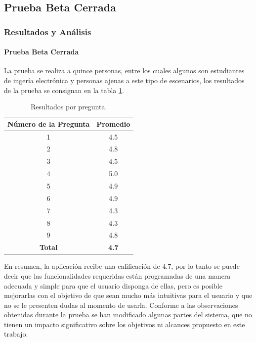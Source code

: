 \subsection{Prueba Beta Cerrada}
\begin{frame}[t]
\frametitle{Resultados y Análisis}
\framesubtitle{Prueba Beta Cerrada}
\footnotesize %
La prueba se realiza a quince personas, entre los cuales algunos son estudiantes de ingería electrónica y personas ajenas a este tipo de escenarios, los resultados de la prueba se consignan en la tabla \ref{table:enc}.

\begin{table}[H]
	\begin{center}
		\caption{Resultados por pregunta.}
		\label{table:enc}
		\begin{tabular}{|c|c|}
			\hline 
			\textbf{Número de la Pregunta} & \textbf{Promedio} \\ 
			\hline 
			1 & 4.5\\ 
			\hline 
			2 & 4.8\\ 
			\hline 
			3 & 4.5\\ 
			\hline 
			4 & 5.0\\ 
			\hline 
			5 & 4.9\\ 
			\hline 
			6 & 4.9\\ 
			\hline 
			7 & 4.3\\ 
			\hline 
			8 & 4.3\\ 
			\hline 
			9 & 4.8\\ 
			\hline 
			\textbf{Total} & \textbf{4.7}\\ 
			\hline 
		\end{tabular} 
	\end{center}
\end{table}

En resumen, la aplicación recibe una calificación de 4.7, por lo tanto se puede decir que las funcionalidades requeridas están programadas de una manera adecuada y simple para que el usuario disponga de ellas, pero es posible mejorarlas con el objetivo de que sean mucho más intuitivas para el usuario y que no se le presenten dudas al momento de usarla. Conforme a las observaciones obtenidas durante la prueba se han modificado algunas partes del sistema, que no tienen un impacto significativo sobre los objetivos ni alcances propuesto en este trabajo.\\

\end{frame}